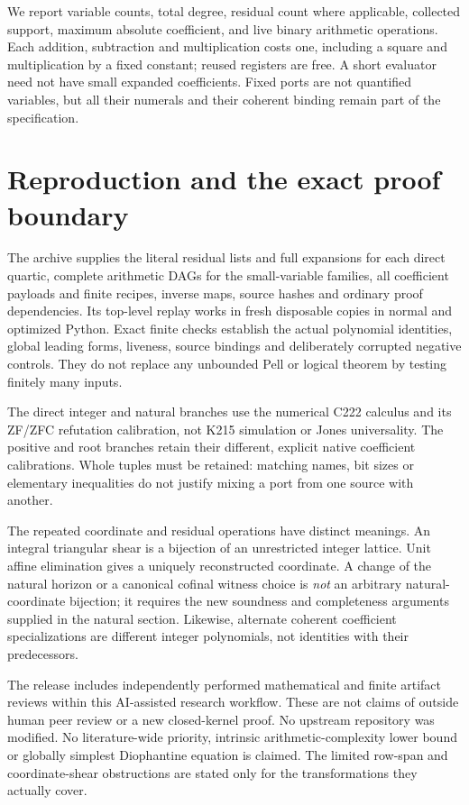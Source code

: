 \documentclass[11pt]{article}
\theoremstyle{definition}\newtheorem{definition}[theorem]{Definition}
\theoremstyle{remark}\newtheorem{remark}[theorem]{Remark}
\begin{document}
We report variable counts, total degree, residual count where applicable,
collected support, maximum absolute coefficient, and live binary
arithmetic operations. Each addition, subtraction and multiplication
costs one, including a square and multiplication by a fixed constant;
reused registers are free. A short evaluator need not have small expanded
coefficients. Fixed ports are not quantified variables, but all their
numerals and their coherent binding remain part of the specification.







\section{Reproduction and the exact proof boundary}
The archive supplies the literal residual lists and full expansions for
each direct quartic, complete arithmetic DAGs for the small-variable
families, all coefficient payloads and finite recipes, inverse maps,
source hashes and ordinary proof dependencies. Its top-level replay
works in fresh disposable copies in normal and optimized Python.
Exact finite checks establish the actual polynomial identities, global
leading forms, liveness, source bindings and deliberately corrupted
negative controls. They do not replace any unbounded Pell or logical
theorem by testing finitely many inputs.

The direct integer and natural branches use the numerical C222 calculus
and its ZF/ZFC refutation calibration, not K215 simulation or Jones
universality. The positive and root branches retain their different,
explicit native coefficient calibrations. Whole tuples must be retained:
matching names, bit sizes or elementary inequalities do not justify
mixing a port from one source with another.

The repeated coordinate and residual operations have distinct meanings.
An integral triangular shear is a bijection of an unrestricted integer
lattice. Unit affine elimination gives a uniquely reconstructed coordinate.
A change of the natural horizon or a canonical cofinal witness choice is
\emph{not} an arbitrary natural-coordinate bijection; it requires the new
soundness and completeness arguments supplied in the natural section.
Likewise, alternate coherent coefficient specializations are different
integer polynomials, not identities with their predecessors.

The release includes independently performed mathematical and finite
artifact reviews within this AI-assisted research workflow. These are
not claims of outside human peer review or a new closed-kernel proof.
No upstream repository was modified. No literature-wide priority,
intrinsic arithmetic-complexity lower bound or globally simplest
Diophantine equation is claimed. The limited row-span and coordinate-shear
obstructions are stated only for the transformations they actually cover.
\appendix


\end{document}
